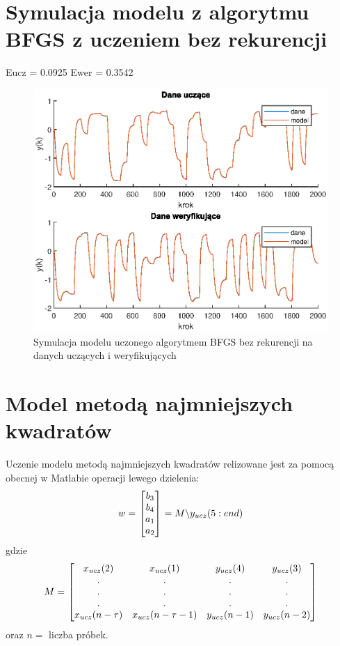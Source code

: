 		\newpage
	\section{Symulacja modelu z algorytmu BFGS z uczeniem bez rekurencji}
		\label{sec:bfgs_arx_sym}
		Eucz = 0.0925
		Ewer = 0.3542
		
		\begin{figure}[h!]
			\centering
			\includegraphics[width=\linewidth]{img/BFGS_ARX_d.eps}
			\caption{Symulacja modelu uczonego algorytmem BFGS bez rekurencji na danych uczących i weryfikujących}
			\label{fig:bfgs_arx_d}
		\end{figure}
		
		\newpage
	\section{Model metodą najmniejszych kwadratów}
		\label{sec:mnk}
		Uczenie modelu metodą najmniejszych kwadratów relizowane jest za pomocą obecnej w Matlabie operacji lewego dzielenia:
		\begin{equation}
		\begin{tabular}{l}
		$w = $ $\begin{bmatrix}b_3\\b_4\\a_1\\a_2\end{bmatrix}$ $=M\backslash y_{ucz}(5:end)$
		\end{tabular}
		\label{eq:mnk}
		\end{equation}
		gdzie
		\begin{equation}
		\begin{tabular}{l}
		$M = $ $\begin{bmatrix}x_{ucz}(2)&x_{ucz}(1)&y_{ucz}(4)&y_{ucz}(3)\\.&.&.&.\\.&.&.&.\\.&.&.&.\\x_{ucz}(n-\tau)&x_{ucz}(n-\tau -1)&y_{ucz}(n-1)&y_{ucz}(n-2)\end{bmatrix}$
		\end{tabular}
		\label{eq:M_mnk}
		\end{equation}
		oraz $n =$ liczba próbek.
		
